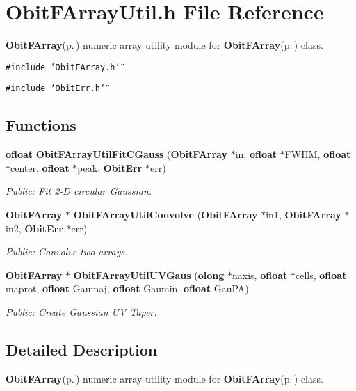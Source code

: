 \section{Obit\-FArray\-Util.h File Reference}
\label{ObitFArrayUtil_8h}
{\bf Obit\-FArray}{\rm (p.\,\pageref{structObitFArray})} numeric array utility module for {\bf Obit\-FArray}{\rm (p.\,\pageref{structObitFArray})} class. 

{\tt \#include \char`\"{}Obit\-FArray.h\char`\"{}}\par
{\tt \#include \char`\"{}Obit\-Err.h\char`\"{}}\par
\subsection*{Functions}
\begin{CompactItemize}
\item 
{\bf ofloat} {\bf Obit\-FArray\-Util\-Fit\-CGauss} ({\bf Obit\-FArray} $\ast$in, {\bf ofloat} $\ast$FWHM, {\bf ofloat} $\ast$center, {\bf ofloat} $\ast$peak, {\bf Obit\-Err} $\ast$err)
\begin{CompactList}\small\item\em Public: Fit 2-D circular Gaussian. \item\end{CompactList}\item 
{\bf Obit\-FArray} $\ast$ {\bf Obit\-FArray\-Util\-Convolve} ({\bf Obit\-FArray} $\ast$in1, {\bf Obit\-FArray} $\ast$in2, {\bf Obit\-Err} $\ast$err)
\begin{CompactList}\small\item\em Public: Convolve two arrays. \item\end{CompactList}\item 
{\bf Obit\-FArray} $\ast$ {\bf Obit\-FArray\-Util\-UVGaus} ({\bf olong} $\ast$naxis, {\bf ofloat} $\ast$cells, {\bf ofloat} maprot, {\bf ofloat} Gaumaj, {\bf ofloat} Gaumin, {\bf ofloat} Gau\-PA)
\begin{CompactList}\small\item\em Public: Create Gaussian UV Taper. \item\end{CompactList}\end{CompactItemize}


\subsection{Detailed Description}
{\bf Obit\-FArray}{\rm (p.\,\pageref{structObitFArray})} numeric array utility module for {\bf Obit\-FArray}{\rm (p.\,\pageref{structObitFArray})} class. 

